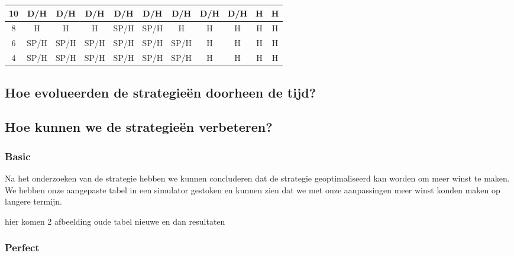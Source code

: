 \documentclass[conference]{IEEEtran}
\begin{document}
\begin{table}[h]
\begin{tabular}{|c|c|c|c|c|c|c|c|c|c|c|}
10 & \cellcolor[HTML]{F8FF00}D/H & \cellcolor[HTML]{F8FF00}D/H & \cellcolor[HTML]{F8FF00}D/H & \cellcolor[HTML]{F8FF00}D/H & \cellcolor[HTML]{F8FF00}D/H & \cellcolor[HTML]{F8FF00}D/H & \cellcolor[HTML]{F8FF00}D/H & \cellcolor[HTML]{F8FF00}D/H & \cellcolor[HTML]{FE0000}H & \cellcolor[HTML]{FE0000}H \\ \hline
8 & \cellcolor[HTML]{FE0000}H & \cellcolor[HTML]{FE0000}H & \cellcolor[HTML]{FE0000}H & \cellcolor[HTML]{FFC702}SP/H & \cellcolor[HTML]{FFC702}SP/H & \cellcolor[HTML]{FE0000}H & \cellcolor[HTML]{FE0000}H & \cellcolor[HTML]{FE0000}H & \cellcolor[HTML]{FE0000}H & \cellcolor[HTML]{FE0000}H \\ \hline
6 & \cellcolor[HTML]{FFC702}SP/H & \cellcolor[HTML]{FFC702}SP/H & \cellcolor[HTML]{FFC702}SP/H & \cellcolor[HTML]{FFC702}SP/H & \cellcolor[HTML]{FFC702}SP/H & \cellcolor[HTML]{FFC702}SP/H & \cellcolor[HTML]{FE0000}H & \cellcolor[HTML]{FE0000}H & \cellcolor[HTML]{FE0000}H & \cellcolor[HTML]{FE0000}H \\ \hline
4 & \cellcolor[HTML]{FFC702}SP/H & \cellcolor[HTML]{FFC702}SP/H & \cellcolor[HTML]{FFC702}SP/H & \cellcolor[HTML]{FFC702}SP/H & \cellcolor[HTML]{FFC702}SP/H & \cellcolor[HTML]{FFC702}SP/H & \cellcolor[HTML]{FE0000}H & \cellcolor[HTML]{FE0000}H & \cellcolor[HTML]{FE0000}H & \cellcolor[HTML]{FE0000}H \\ \hline
\end{tabular}
\end{table}


\subsection{Hoe evolueerden de strategieën doorheen de tijd?}

\subsection{Hoe kunnen we de strategieën verbeteren?}
\subsubsection{Basic}
Na het onderzoeken van de strategie hebben we kunnen concluderen dat de strategie geoptimaliseerd kan worden om meer winst te maken.
We hebben onze aangepaste tabel in een simulator gestoken en kunnen zien dat we met onze aanpassingen meer winst konden maken op langere termijn.

hier komen 2 afbeelding oude tabel nieuwe en dan resultaten
\subsubsection{Perfect}
\end{document}
